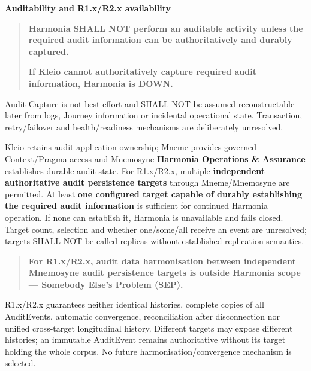 \par\medskip\textbf{Auditability and R1.x/R2.x availability}\par


\begin{quote}


\textbf{Harmonia SHALL NOT perform an auditable activity unless the required audit
information can be authoritatively and durably captured.}



\textbf{If Kleio cannot authoritatively capture required audit information, Harmonia
is DOWN.}



\end{quote}


Audit Capture is not best-effort and SHALL NOT be assumed reconstructable later
from logs, Journey information or incidental operational state. Transaction,
retry/failover and health/readiness mechanisms are deliberately unresolved.



Kleio retains audit application ownership; Mneme provides governed Context/Pragma access
and Mnemosyne \textbf{Harmonia Operations \& Assurance} establishes durable audit state.
For R1.x/R2.x, multiple \textbf{independent authoritative audit persistence targets}
through Mneme/Mnemosyne are permitted. At least \textbf{one configured target capable
of durably establishing the required audit information} is sufficient for
continued Harmonia operation. If none can establish it, Harmonia is unavailable
and fails closed. Target count, selection and whether one/some/all receive an
event are unresolved; targets SHALL NOT be called replicas without established
replication semantics.



\begin{quote}


\textbf{For R1.x/R2.x, audit data harmonisation between independent Mnemosyne audit
persistence targets is outside Harmonia scope — Somebody Else's Problem (SEP).}



\end{quote}


R1.x/R2.x guarantees neither identical histories, complete copies of all
AuditEvents, automatic convergence, reconciliation after disconnection nor unified
cross-target longitudinal history. Different targets may expose different histories;
an immutable AuditEvent remains authoritative without its target holding the whole
corpus. No future harmonisation/convergence mechanism is selected.



